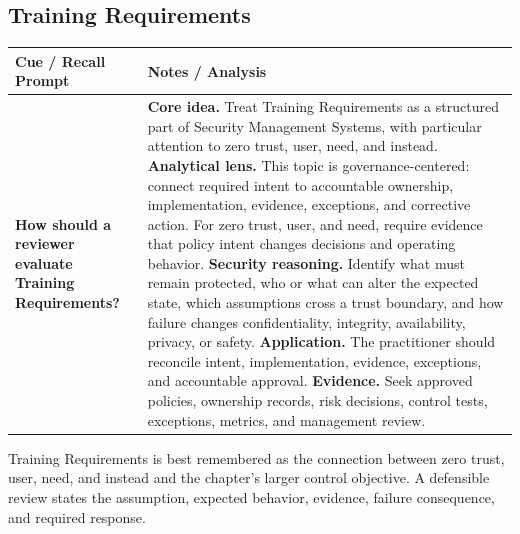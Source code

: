 \documentclass[11pt]{article}
\newcommand{\CornellHeader}{%
\rowcolor{Navy}\color{white}\bfseries Cue / Recall Prompt & \color{white}\bfseries Notes / Analysis\\\hline}
\newcommand{\CornellRow}[2]{%
\cellcolor{CueGray}\RaggedRight\textbf{#1} & \RaggedRight #2\\\hline}
\begin{document}
\subsection*{Training Requirements}
\begin{longtable}{>{\RaggedRight\arraybackslash}p{}|>{\RaggedRight\arraybackslash}p{}}
\CornellHeader
\CornellRow{How should a reviewer evaluate Training Requirements?}{\textbf{Core idea.} Treat Training Requirements as a structured part of Security Management Systems, with particular attention to zero trust, user, need, and instead. \textbf{Analytical lens.} This topic is governance-centered: connect required intent to accountable ownership, implementation, evidence, exceptions, and corrective action. For zero trust, user, and need, require evidence that policy intent changes decisions and operating behavior. \textbf{Security reasoning.} Identify what must remain protected, who or what can alter the expected state, which assumptions cross a trust boundary, and how failure changes confidentiality, integrity, availability, privacy, or safety. \textbf{Application.} The practitioner should reconcile intent, implementation, evidence, exceptions, and accountable approval. \textbf{Evidence.} Seek approved policies, ownership records, risk decisions, control tests, exceptions, metrics, and management review.}
\end{longtable}
\begin{topicsummary}
Training Requirements is best remembered as the connection between zero trust, user, need, and instead and the chapter's larger control objective. A defensible review states the assumption, expected behavior, evidence, failure consequence, and required response.
\end{topicsummary}
\end{document}
